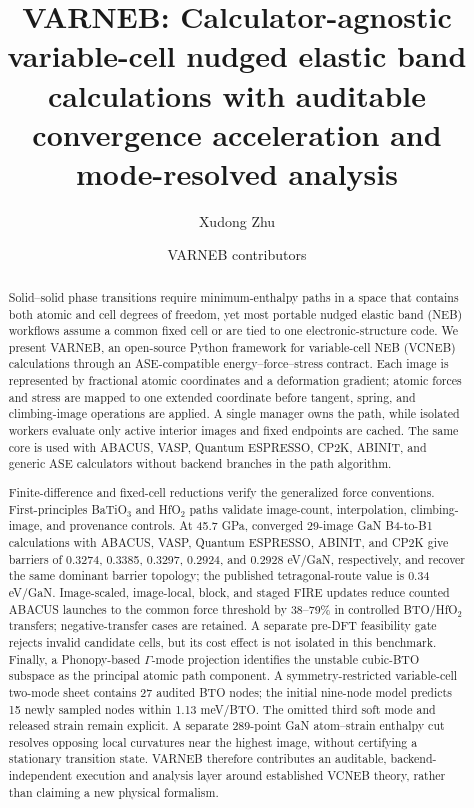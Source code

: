 \documentclass[final,5p,times,twocolumn]{elsarticle}
\begin{document}
\begin{frontmatter}
\title{VARNEB: Calculator-agnostic variable-cell nudged elastic band calculations with auditable convergence acceleration and mode-resolved analysis}

\author[a]{Xudong Zhu}
\author[a]{VARNEB contributors}
\address[a]{Affiliation and postal address to be confirmed before submission}

\begin{abstract}
Solid--solid phase transitions require minimum-enthalpy paths in a space that
contains both atomic and cell degrees of freedom, yet most portable nudged
elastic band (NEB) workflows assume a common fixed cell or are tied to one
electronic-structure code. We present VARNEB, an open-source Python framework
for variable-cell NEB (VCNEB) calculations through an ASE-compatible
energy--force--stress contract. Each image is represented by fractional atomic
coordinates and a deformation gradient; atomic forces and stress are mapped to
one extended coordinate before tangent, spring, and climbing-image operations
are applied. A single manager owns the path, while isolated workers evaluate
only active interior images and fixed endpoints are cached. The same core is
used with ABACUS, VASP, Quantum ESPRESSO, CP2K, ABINIT, and generic ASE
calculators without backend branches in the path algorithm.

Finite-difference and fixed-cell reductions verify the generalized force
conventions. First-principles BaTiO$_3$ and HfO$_2$ paths validate image-count,
interpolation, climbing-image, and provenance controls. At 45.7 GPa, converged
29-image GaN B4-to-B1 calculations with ABACUS, VASP, Quantum ESPRESSO,
ABINIT, and CP2K give barriers of 0.3274, 0.3385, 0.3297, 0.2924, and
0.2928 eV/GaN,
respectively, and recover the same dominant barrier topology; the published
tetragonal-route value is 0.34 eV/GaN. Image-scaled, image-local, block,
and staged FIRE updates reduce counted ABACUS
launches to the common force threshold by 38--79\% in controlled BTO/HfO$_2$
transfers; negative-transfer cases are retained. A separate pre-DFT feasibility
gate rejects invalid candidate cells, but its cost effect is not isolated in
this benchmark. Finally, a Phonopy-based
$\Gamma$-mode projection identifies the unstable cubic-BTO subspace as the
principal atomic path component. A symmetry-restricted variable-cell two-mode
sheet contains 27 audited BTO nodes; the initial nine-node model predicts
15 newly sampled nodes within 1.13 meV/BTO. The omitted third soft mode and released strain remain
explicit. A separate 289-point GaN atom--strain enthalpy cut resolves opposing
local curvatures near the highest image, without certifying a stationary
transition state. VARNEB therefore contributes an
auditable, backend-independent execution and analysis layer around established
VCNEB theory, rather than claiming a new physical formalism.
\end{abstract}


\end{frontmatter}
\end{document}

